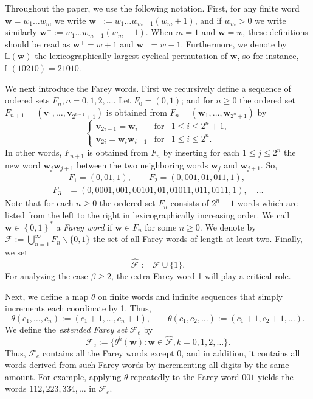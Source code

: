 \documentclass[12pt]{amsart}
\theoremstyle{definition}
\theoremstyle{remark}
\numberwithin{equation}{section}
\renewcommand{\L}{\ensuremath{\mathbb{L}}}
\newcommand{\cF}{\mathcal{F}}
\renewcommand{\v}{\mathbf{v}}
\newcommand{\w}{\mathbf{w}}
\newcommand{\set}[1]{\left\{#1\right\}}
\newcommand{\f}{\infty}
\begin{document}
{Throughout the paper, we use the following notation. First, for any finite word $\w=w_1\dots w_m$ we write $\w^+:=w_1\dots w_{m-1}(w_m+1)$, and if $w_m>0$ we write similarly $\w^-:=w_1\dots w_{m-1}(w_m-1)$. When $m=1$ and $\w=w$, these definitions should be read as $\w^+=w+1$ and $\w^-=w-1$. Furthermore, we denote by $\L(\w)$ the lexicographically largest cyclical permutation of $\w$, so for instance, $\L(10210)=21010$.

We next introduce the Farey words. First we recursively define a sequence of ordered sets $F_n, n=0,1,2,\ldots$. Let $F_0=(0,1)$; and for $n\ge 0$ the ordered set $F_{n+1}=(\v_1, \ldots, \v_{2^{n+1}+1})$ is obtained from $F_{n}=(\w_1,\ldots, \w_{2^n+1})$ by
 \[
 \left\{
 \begin{array}
   {lll}
   \v_{2i-1}=\w_i&\textrm{for}& 1\le i\le 2^{n}+1,\\
   \v_{2i}=\w_i\w_{i+1}&\textrm{for}& 1\le i\le 2^n.
 \end{array}\right.
 \]
In other words, $F_{n+1}$ is obtained from $F_n$ by inserting for each $1\le j\le 2^{n}$ the new word $\w_j\w_{j+1}$ between the two neighboring words $\w_j$ and $\w_{j+1}$. So,
 \begin{equation*} %
 \begin{split}
 &F_1=(0,01,1),\qquad F_2=(0,001,01,011,1),\\
  F_3&=(0,0001,001,00101,01,01011,011,0111,1), \quad \dots
 \end{split}
 \end{equation*}
Note that for each $n\ge 0$ the ordered set $F_n$ consists of $2^n+1$ words which are listed from the left to the right in lexicographically increasing order.
We call $\w\in\set{0,1}^*$ a \emph{Farey word} if $\w\in F_n$ for some $n\ge 0$. We denote by $\cF:=\bigcup_{n=1}^\f F_n\backslash\{0,1\}$ the set of all Farey words of length at least two. Finally, we set 
\[
\hat{\cF}:=\cF\cup\{1\}.
\] 
For analyzing the case $\beta\geq 2$, the extra Farey word 1 will play a critical role.

Next, we define a map $\theta$ on finite words and infinite sequences that simply increments each coordinate by 1. Thus,
\begin{equation} \label{eq:theta}
\theta(c_1,\dots,c_n):=(c_1+1,\dots,c_n+1), \qquad \theta(c_1,c_2,\dots):=(c_1+1,c_2+1,\dots).
\end{equation}
We define the {\em extended Farey set} $\cF_e$ by
\[
\cF_e:=\{\theta^k(\w): \w\in \hat{\cF}, k=0,1,2,\dots\}.
\]
Thus, $\cF_e$ contains all the Farey words except $0$, and in addition, it contains all words derived from such Farey words by incrementing all digits by the same amount. For example, applying $\theta$ repeatedly to the Farey word $001$ yields the words $112, 223, 334, \dots$ in $\cF_e$.

}
\end{document}
